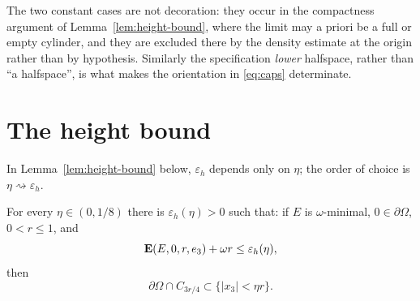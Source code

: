 \begin{fnote}\label{fnote:zero-excess-degenerate}
The two constant cases are not decoration: they occur in the compactness
argument of Lemma~\ref{lem:height-bound}, where the limit may a priori be a
full or empty cylinder, and they are excluded there by the density estimate at
the origin rather than by hypothesis.  Similarly the specification
\emph{lower} halfspace, rather than ``a halfspace'', is what makes the
orientation in \eqref{eq:caps} determinate.
\end{fnote}

\section{The height bound}

\begin{constants}\label{const:height}
In Lemma~\ref{lem:height-bound} below, $\varepsilon_h$ depends only on $\eta$; the order of choice is
$\eta\rightsquigarrow\varepsilon_h$.
\end{constants}

\begin{lemma}\label{lem:height-bound}
For every $\eta\in(0,1/8)$ there is $\varepsilon_h(\eta)>0$ such that: if $E$
is $\omega$-minimal, $0\in\partial\Omega$, $0<r\le1$, and
\begin{equation}\label{eq:height-hyp}
  \operatorname{\mathbf E}(E,0,r,e_3)+\omega r\le\varepsilon_h(\eta),
\end{equation}
then
\begin{equation}\label{eq:height-concl}
  \partial\Omega\cap C_{3r/4}\subset\{|x_3|<\eta r\}.
\end{equation}
\end{lemma}

